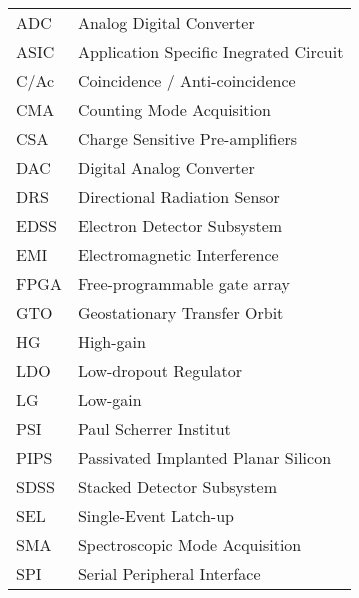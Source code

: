 \begin{center}
\begin{tabular}{p{2cm}p{8cm}}
	ADC & Analog Digital Converter \\
	ASIC & Application Specific Inegrated Circuit \\
    C/Ac & Coincidence / Anti-coincidence \\
    CMA & Counting Mode Acquisition \\
	CSA & Charge Sensitive Pre-amplifiers \\
	DAC & Digital Analog Converter \\
	DRS & Directional Radiation Sensor \\
	EDSS & Electron Detector Subsystem \\
	EMI & Electromagnetic Interference \\
    FPGA & Free-programmable gate array \\
	GTO & Geostationary Transfer Orbit \\
    HG & High-gain \\
	LDO & Low-dropout Regulator \\
    LG & Low-gain \\
	PSI & Paul Scherrer Institut \\
	PIPS & Passivated Implanted Planar Silicon \\
	SDSS & Stacked Detector Subsystem \\
	SEL & Single-Event Latch-up \\
    SMA & Spectroscopic Mode Acquisition \\
	SPI & Serial Peripheral Interface \\
    
\end{tabular}
\end{center}
